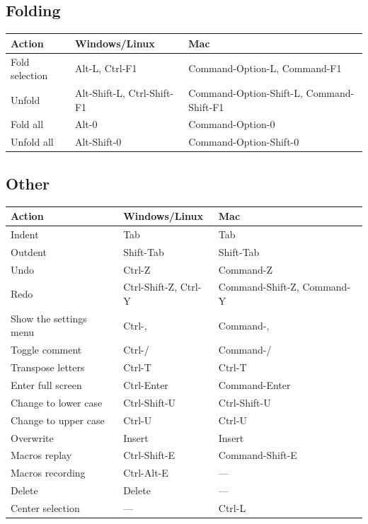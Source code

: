 \documentclass[
]{book}
\begin{document}
\hypertarget{folding}{%
\subsection{Folding}\label{folding}}

\begin{longtable}[]{@{}lll@{}}
\toprule
Action & Windows/Linux & Mac \\
\midrule
\endhead
Fold selection & Alt-L, Ctrl-F1 & Command-Option-L, Command-F1 \\
Unfold & Alt-Shift-L, Ctrl-Shift-F1 & Command-Option-Shift-L, Command-Shift-F1 \\
Fold all & Alt-0 & Command-Option-0 \\
Unfold all & Alt-Shift-0 & Command-Option-Shift-0 \\
\bottomrule
\end{longtable}

\hypertarget{other}{%
\subsection{Other}\label{other}}

\begin{longtable}[]{@{}lll@{}}
\toprule
Action & Windows/Linux & Mac \\
\midrule
\endhead
Indent & Tab & Tab \\
Outdent & Shift-Tab & Shift-Tab \\
Undo & Ctrl-Z & Command-Z \\
Redo & Ctrl-Shift-Z, Ctrl-Y & Command-Shift-Z, Command-Y \\
Show the settings menu & Ctrl-, & Command-, \\
Toggle comment & Ctrl-/ & Command-/ \\
Transpose letters & Ctrl-T & Ctrl-T \\
Enter full screen & Ctrl-Enter & Command-Enter \\
Change to lower case & Ctrl-Shift-U & Ctrl-Shift-U \\
Change to upper case & Ctrl-U & Ctrl-U \\
Overwrite & Insert & Insert \\
Macros replay & Ctrl-Shift-E & Command-Shift-E \\
Macros recording & Ctrl-Alt-E & --- \\
Delete & Delete & --- \\
Center selection & --- & Ctrl-L \\
\bottomrule
\end{longtable}
\end{document}
